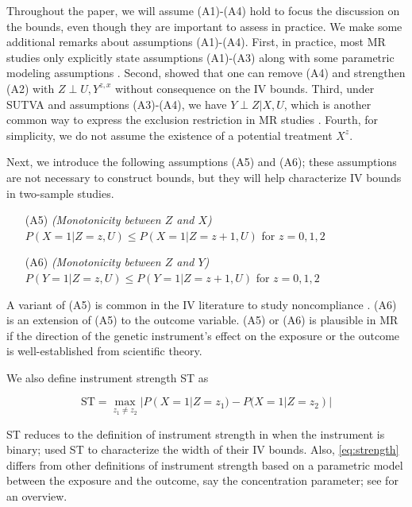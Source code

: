 \documentclass[
]{article}
\theoremstyle{plain}
\begin{document}
Throughout the paper, we will assume (A1)-(A4) hold to focus the discussion on the bounds, even though they are important to assess in practice. We make some additional remarks about assumptions (A1)-(A4). First, in practice, most MR studies only explicitly state assumptions (A1)-(A3) along with some parametric modeling assumptions \autocite{burgess_mendelian_2015}. Second, \textcite{richardson_ace_2014} showed that one can remove (A4) and strengthen (A2) with \(Z \perp U, Y^{z,x}\) without consequence on the IV bounds. Third, under SUTVA and assumptions (A3)-(A4), we have \(Y \perp Z | X, U\), which is another common way to express the exclusion restriction in MR studies \autocite{didelez_mendelian_2007,swanson_partial_2018}. Fourth, for simplicity, we do not assume the existence of a potential treatment \(X^{z}\).

Next, we introduce the following assumptions (A5) and (A6); these assumptions are not necessary to construct bounds, but they will help characterize IV bounds in two-sample studies.

\begin{itemize}
\item[(A5)] \emph{(Monotonicity between $Z$ and $X$)} $P(X = 1 | Z = z, U) \le P(X = 1 | Z = z+1, U)$ for $z=0,1,2$
\item[(A6)] \emph{(Monotonicity between $Z$ and $Y$)} $P(Y = 1 | Z = z, U) \le P(Y = 1 | Z = z+1, U)$ for $z=0,1,2$
\end{itemize}

A variant of (A5) is common in the IV literature to study noncompliance \autocite{angrist_identification_1996,baiocchi_instrumental_2014}. (A6) is an extension of (A5) to the outcome variable. (A5) or (A6) is plausible in MR if the direction of the genetic instrument's effect on the exposure or the outcome is well-established from scientific theory.

We also define instrument strength ST as

\begin{equation}
\text{ST} = \max_{z_1 \neq z_2} | P(X = 1 | Z = z_1) - P(X = 1 | Z = z_2) | \label{eq:strength}
\end{equation}

ST reduces to the definition of instrument strength in \textcite{balke_bounds_1997} when the instrument is binary; \textcite{balke_bounds_1997} used ST to characterize the width of their IV bounds. Also, \eqref{eq:strength} differs from other definitions of instrument strength based on a parametric model between the exposure and the outcome, say the concentration parameter; see \textcite{stock_survey_2002} for an overview.
\end{document}
